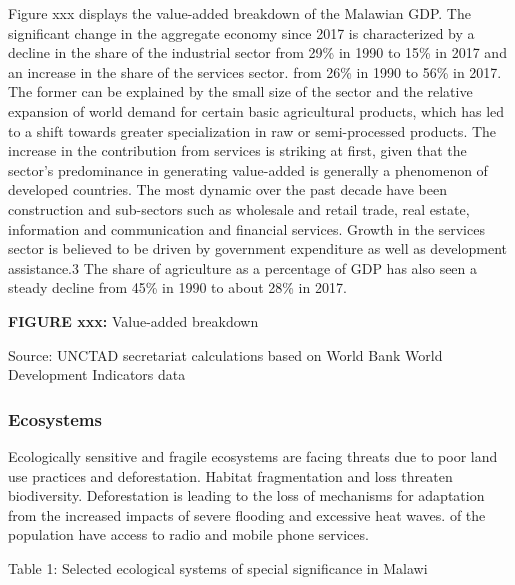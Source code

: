 \documentclass[
]{book}
\begin{document}
Figure xxx displays the value-added breakdown of the Malawian GDP. The significant change in the aggregate economy since 2017 is characterized by a decline in
the share of the industrial sector from 29\% in 1990 to 15\% in 2017 and an increase in the share of the services sector. from 26\% in 1990 to 56\% in 2017. The
former can be explained by the small size of the sector and the relative expansion of world demand for certain basic agricultural products, which has led to a
shift towards greater specialization in raw or semi-processed products. The increase in the contribution from services is striking at first, given that the
sector's predominance in generating value-added is generally a phenomenon of developed countries. The most dynamic over the past decade have been construction
and sub-sectors such as wholesale and retail trade, real estate, information and communication and financial services. Growth in the services sector is believed
to be driven by government expenditure as well as development assistance.3 The share of agriculture as a percentage of GDP has also seen a steady decline from
45\% in 1990 to about 28\% in 2017.

\textbf{FIGURE xxx:} Value-added breakdown

Source: UNCTAD secretariat calculations based on World Bank World Development Indicators data

\hypertarget{ecosystems}{%
\subsubsection{Ecosystems}\label{ecosystems}}

Ecologically sensitive and fragile ecosystems are facing threats due to poor land use practices and deforestation. Habitat fragmentation and loss threaten
biodiversity. Deforestation is leading to the loss of mechanisms for adaptation from the increased impacts of severe flooding and excessive heat waves.
of the population have access to radio and mobile phone services.

Table 1: Selected ecological systems of special significance in Malawi
\end{document}
